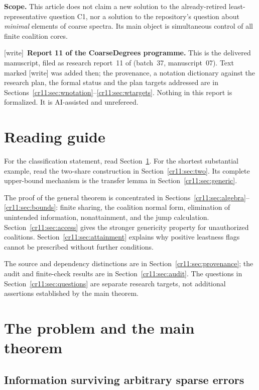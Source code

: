 \documentclass[11pt,letterpaper]{article}
\theoremstyle{plain}
\theoremstyle{definition}
\theoremstyle{remark}
\numberwithin{equation}{section}
\newcommand{\wtag}{\textup{[write]}}
\begin{document}
\noindent\textbf{Scope.} This article does not claim a new solution to the
already-retired least-representative question C1, nor a solution to the
repository's question about \emph{minimal} elements of coarse spectra.
Its main object is simultaneous control of all finite coalition cores.

\medskip
\noindent\wtag\ \textbf{Report 11 of the CoarseDegrees programme.} This
is the delivered manuscript, filed as research report~11 of
(batch~37, manuscript~07). Text marked \wtag{} was added then; the
provenance, a notation dictionary against the research plan, the formal
status and the plan targets addressed are in
Sections~\ref{cr11:sec:wnotation}--\ref{cr11:sec:wtargets}. Nothing in this
report is formalized. It is AI-assisted and unrefereed.

\newpage
\tableofcontents
\vspace{12pt}
\section*{Reading guide}
For the classification statement, read Section~\ref{cr11:sec:main}. For the
shortest substantial example, read the two-share construction in
Section~\ref{cr11:sec:two}. Its complete upper-bound mechanism is the transfer
lemma in Section~\ref{cr11:sec:generic}.

The proof of the general theorem is concentrated in
Sections~\ref{cr11:sec:algebra}--\ref{cr11:sec:bounds}: finite sharing, the coalition
normal form, elimination of unintended information, nonattainment, and the
jump calculation. Section~\ref{cr11:sec:access} gives the stronger genericity
property for unauthorized coalitions. Section~\ref{cr11:sec:attainment} explains
why positive leastness flags cannot be prescribed without further
conditions.

The source and dependency distinctions are in
Section~\ref{cr11:sec:provenance}; the audit and finite-check results are in
Section~\ref{cr11:sec:audit}. The questions in Section~\ref{cr11:sec:questions} are
separate research targets, not additional assertions established by the
main theorem.
\newpage

\section{The problem and the main theorem}\label{cr11:sec:main}

\subsection{Information surviving arbitrary sparse errors}
\end{document}
